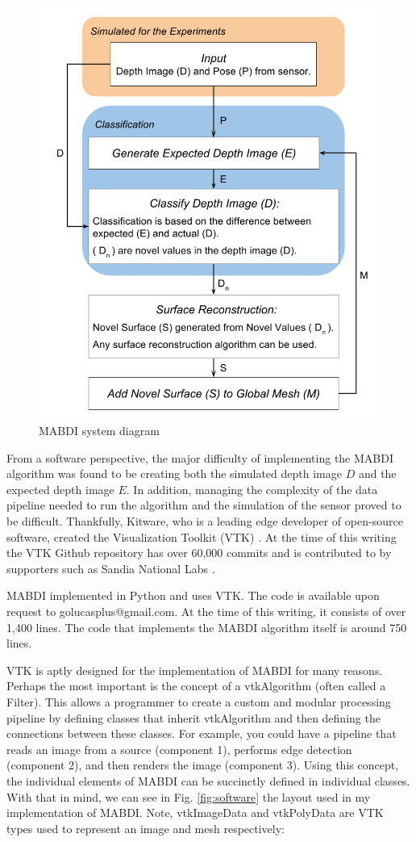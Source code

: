 \begin{figure}[h]%
\centering
\includegraphics[width=.75\textwidth]{figures/diagram_system.png}
\caption{MABDI system diagram}
\label{fig:system}
\end{figure}

From a software perspective, the major difficulty of implementing the MABDI
algorithm was found to be creating both the simulated depth image $D$ and the
expected depth image $E$. In addition, managing the complexity of the data
pipeline needed to run the algorithm and the simulation of the sensor proved to
be difficult. Thankfully, Kitware, who is a leading
edge developer of open-source software, created the Visualization Toolkit (VTK)
\cite{schroeder2004visualization, sitevtk}. At the time of this writing the VTK
Github repository has over 60,000 commits and is contributed to by supporters
such as Sandia National Labs \cite{sitesandia}.

MABDI implemented in Python and uses VTK. The code is available upon request to
golucasplus@gmail.com. At the time of this writing, it consists of over 1,400
lines. The code that implements the MABDI algorithm itself is around 750 lines.

VTK is aptly designed for the implementation of MABDI for many reasons. Perhaps
the most important is the concept of a vtkAlgorithm (often called a Filter).
This allows a programmer to create a custom and modular processing pipeline by
defining classes that inherit vtkAlgorithm and then defining the connections
between these classes. For example, you could have a pipeline that reads an
image from a source (component 1), performs edge detection (component 2), and
then renders the image (component 3). Using this concept, the individual
elements of MABDI can be succinctly defined in individual classes. With that in
mind, we can see in Fig. \ref{fig:software} the layout used in my implementation
of MABDI. Note, vtkImageData and vtkPolyData are VTK types used to represent an
image and mesh respectively:

